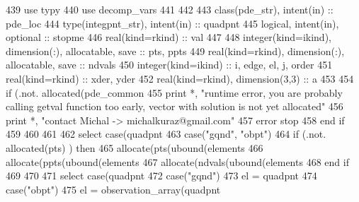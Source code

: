 \begin{DoxyCode}
439       \textcolor{keywordtype}{use }typy
440       \textcolor{keywordtype}{use }decomp_vars
441 
442       
443       \textcolor{keywordtype}{class}(pde_str), \textcolor{keywordtype}{intent(in)} :: pde\_loc
444       \textcolor{keywordtype}{type}(integpnt_str), \textcolor{keywordtype}{intent(in)} :: quadpnt
445       \textcolor{keywordtype}{logical}, \textcolor{keywordtype}{intent(in)}, \textcolor{keywordtype}{optional} :: stopme
446       \textcolor{keywordtype}{real(kind=rkind)} :: val
447       
448       \textcolor{keywordtype}{integer(kind=ikind)}, \textcolor{keywordtype}{dimension(:)}, \textcolor{keywordtype}{allocatable}, \textcolor{keywordtype}{save} :: pts, ppts
449       \textcolor{keywordtype}{real(kind=rkind)}, \textcolor{keywordtype}{dimension(:)}, \textcolor{keywordtype}{allocatable}, \textcolor{keywordtype}{save} :: ndvals
450       \textcolor{keywordtype}{integer(kind=ikind)} :: i, edge, el, j, order
451       \textcolor{keywordtype}{real(kind=rkind)} :: xder, yder
452       \textcolor{keywordtype}{real(kind=rkind)}, \textcolor{keywordtype}{dimension(3,3)} :: a
453       
454       \textcolor{keywordflow}{if} (.not. \textcolor{keyword}{allocated}(pde_common%
455         print *, \textcolor{stringliteral}{"runtime error, you are probably calling getval function too early, vector with solution
       is not yet allocated"}
456         print *, \textcolor{stringliteral}{"contact Michal -> michalkuraz@gmail.com"}
457         error stop
458 \textcolor{keywordflow}{      end if}
459       
460             
461       
462      \textcolor{keywordflow}{select case}(quadpnt%
463         \textcolor{keywordflow}{case}(\textcolor{stringliteral}{"gqnd"}, \textcolor{stringliteral}{"obpt"})
464             \textcolor{keywordflow}{if} (.not. \textcolor{keyword}{allocated}(pts) ) \textcolor{keywordflow}{then}
465               \textcolor{keyword}{allocate}(pts(ubound(elements%
466               \textcolor{keyword}{allocate}(ppts(ubound(elements%
467               \textcolor{keyword}{allocate}(ndvals(ubound(elements%
468 \textcolor{keywordflow}{            end if}
469             
470             
471             \textcolor{keywordflow}{select case}(quadpnt%
472               \textcolor{keywordflow}{case}(\textcolor{stringliteral}{"gqnd"})
473                 el = quadpnt%
474               \textcolor{keywordflow}{case}(\textcolor{stringliteral}{"obpt"})
475                 el = observation_array(quadpnt%

\end{DoxyCode}
